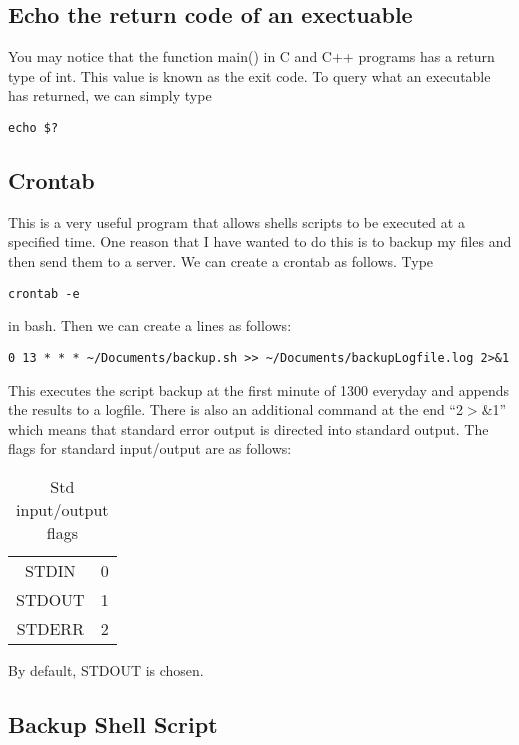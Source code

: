 \documentclass[a4paper, 10pt]{article}
\begin{document}
\subsection{Echo the return code of an exectuable}
You may notice that the function main() in C and C++ programs has a return type of int. This value is known as the exit code. To query what an executable has returned, we can simply type
\begin{verbatim}
echo $?
\end{verbatim}

\subsection*{Crontab}

This is a very useful program that allows shells scripts to be executed at a specified time. One reason that I have wanted to do this is to backup my files and then send them to a server. We can create a crontab as follows. Type
\begin{Verbatim}
crontab -e
\end{Verbatim}
in bash. Then we can create a lines as follows:
\begin{Verbatim}
0 13 * * * ~/Documents/backup.sh >> ~/Documents/backupLogfile.log 2>&1
\end{Verbatim}
This executes the script backup at the first minute of 1300 everyday and appends the results to a logfile. There is also an additional command at the end ``2$>$\&1'' which means that standard error output is directed into standard output. The flags for standard input/output are as follows:
\begin{table}[htdp]
\caption{Std input/output flags}
\begin{center}
\begin{tabular}{|c|c|}
\hline
STDIN & 0\\
STDOUT & 1\\
STDERR & 2\\
\hline
\end{tabular}
\end{center}
\label{default}
\end{table}%
By default, STDOUT is chosen.


\subsection*{Backup Shell Script}
\end{document}
